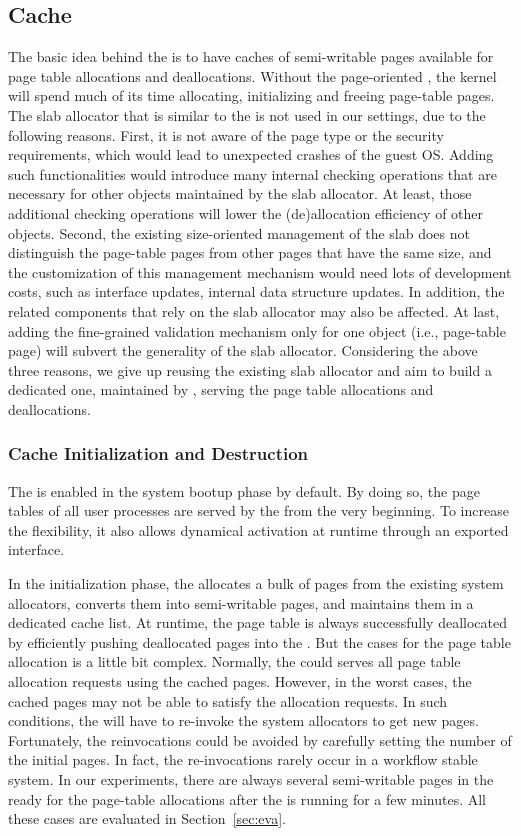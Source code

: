 \subsection{\name Cache}\label{sec:cache}
The basic idea behind the \cache is to have caches of semi-writable pages available for page table allocations and deallocations.
Without the page-oriented \cache, the kernel will spend much of its time allocating, initializing and freeing page-table pages.
The slab allocator that is similar to the \cache is not used in our settings, due to the following reasons.
First, it is not aware of the page type or the security requirements, which would lead to unexpected crashes of the guest OS.
Adding such functionalities would introduce many internal checking operations that are necessary for other objects maintained by the slab allocator.
At least, those additional checking operations will lower the (de)allocation efficiency of other objects.
Second, the existing size-oriented management of the slab does not distinguish the page-table pages from other pages that have the same size, and the customization of this management mechanism would need lots of development costs, such as interface updates, internal data structure updates.
In addition, the related components that rely on the slab allocator may also be affected.
At last, adding the fine-grained validation mechanism only for one object (i.e., page-table page) will subvert the generality of the slab allocator.
Considering the above three reasons, we give up reusing the existing slab allocator and aim to build a dedicated one, maintained by \cache, serving the page table allocations and deallocations.

\subsubsection{\name Cache Initialization and Destruction}
The \cache is enabled in the system bootup phase by default.
By doing so, the page tables of all user processes are served by the \cache from the very beginning.
To increase the flexibility, it also allows dynamical activation at runtime through an exported interface.

In the initialization phase, the \cache allocates a bulk of pages from the existing system allocators, converts them into semi-writable pages, and maintains them in a dedicated cache list.
At runtime, the page table is always successfully deallocated by efficiently pushing deallocated pages into the \cache.
But the cases for the page table allocation is a little bit complex.
Normally, the \cache could serves all page table allocation requests using the cached pages.
However, in the worst cases, the cached pages may not be able to satisfy the allocation requests.
In such conditions, the \cache will have to re-invoke the system allocators to get new pages.
Fortunately, the reinvocations could be avoided by carefully setting the number of the initial pages.
In fact, the re-invocations rarely occur in a workflow stable system.
In our experiments, there are always several  semi-writable pages in the \cache ready for the page-table allocations after the \name is running for a few minutes.
All these cases are evaluated in Section~\ref{sec:eva}.

